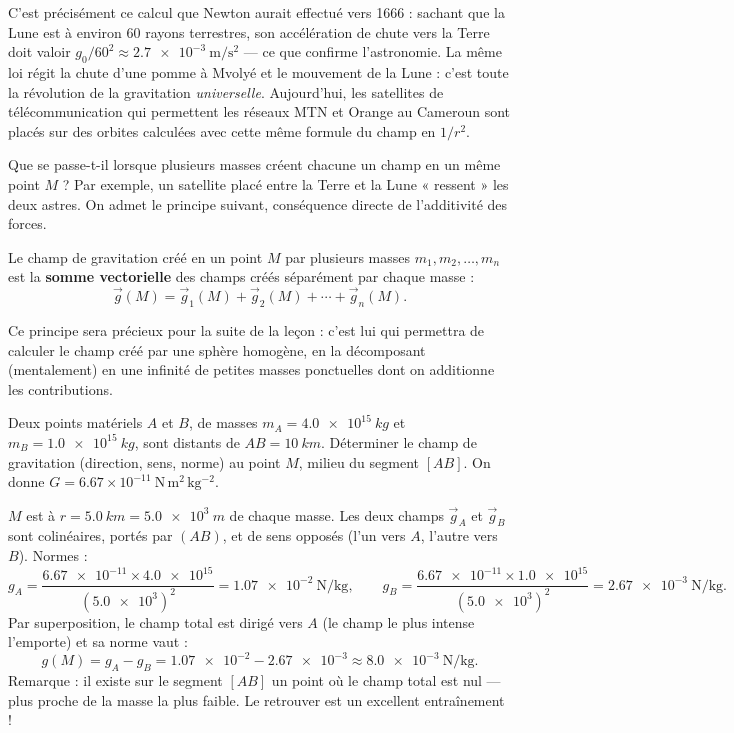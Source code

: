 \documentclass[11pt]{article}
\newcounter{popsec}
\newcounter{popsub}
\newcommand{\courssub}[1]{%
  \stepcounter{popsub}%
  \par\vspace{9pt}\noindent{\popxbold\fontsize{11.5}{13}\selectfont\color{popink}{\color{poporange}\thepopsec.\thepopsub}\hspace{6pt}#1}\par\nopagebreak\vspace{4pt}
}
\begin{document}
\begin{savaistu}
C'est précisément ce calcul que Newton aurait effectué vers 1666 : sachant que la Lune est à environ 60 rayons terrestres, son accélération de chute vers la Terre doit valoir $g_0/60^2 \approx \SI{2,7e-3}{\meter\per\second\squared}$ — ce que confirme l'astronomie. La même loi régit la chute d'une pomme à Mvolyé et le mouvement de la Lune : c'est toute la révolution de la gravitation \emph{universelle}. Aujourd'hui, les satellites de télécommunication qui permettent les réseaux MTN et Orange au Cameroun sont placés sur des orbites calculées avec cette même formule du champ en $1/r^2$.
\end{savaistu}

\courssub{Superposition des champs (admis)}

Que se passe-t-il lorsque plusieurs masses créent chacune un champ en un même point $M$ ? Par exemple, un satellite placé entre la Terre et la Lune « ressent » les deux astres. On admet le principe suivant, conséquence directe de l'additivité des forces.

\begin{propriete}
Le champ de gravitation créé en un point $M$ par plusieurs masses $m_1, m_2, \ldots, m_n$ est la \textbf{somme vectorielle} des champs créés séparément par chaque masse :
\[ \vec{g}(M) = \vec{g}_1(M) + \vec{g}_2(M) + \cdots + \vec{g}_n(M). \]
\end{propriete}

Ce principe sera précieux pour la suite de la leçon : c'est lui qui permettra de calculer le champ créé par une sphère homogène, en la décomposant (mentalement) en une infinité de petites masses ponctuelles dont on additionne les contributions.

\begin{exercice}
Deux points matériels $A$ et $B$, de masses $m_A = \SI{4,0e15}{kg}$ et $m_B = \SI{1,0e15}{kg}$, sont distants de $AB = \SI{10}{km}$. Déterminer le champ de gravitation (direction, sens, norme) au point $M$, milieu du segment $[AB]$. On donne $G = \num{6,67}\times 10^{-11}\ \mathrm{N\,m^2\,kg^{-2}}$.
\end{exercice}

\begin{corrige}
$M$ est à $r = \SI{5,0}{km} = \SI{5,0e3}{m}$ de chaque masse. Les deux champs $\vec{g}_A$ et $\vec{g}_B$ sont colinéaires, portés par $(AB)$, et de sens opposés (l'un vers $A$, l'autre vers $B$). Normes :
\[ g_A = \frac{\num{6,67e-11}\times\num{4,0e15}}{(\num{5,0e3})^2} = \SI{1,07e-2}{\newton\per\kilogram}, \qquad g_B = \frac{\num{6,67e-11}\times\num{1,0e15}}{(\num{5,0e3})^2} = \SI{2,67e-3}{\newton\per\kilogram}. \]
Par superposition, le champ total est dirigé vers $A$ (le champ le plus intense l'emporte) et sa norme vaut :
\[ g(M) = g_A - g_B = \num{1,07e-2} - \num{2,67e-3} \approx \SI{8,0e-3}{\newton\per\kilogram}. \]
Remarque : il existe sur le segment $[AB]$ un point où le champ total est nul — plus proche de la masse la plus faible. Le retrouver est un excellent entraînement !
\end{corrige}
\end{document}
